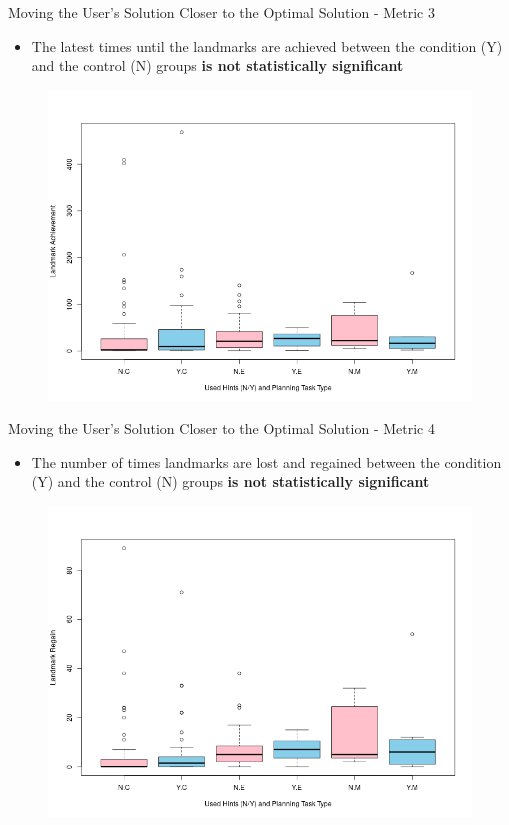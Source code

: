 \begin{frame}{Moving the User's Solution Closer to the Optimal Solution - Metric 3}

\begin{itemize}
\item The latest times until the landmarks are achieved between the condition (Y) and the control (N) groups \textbf{is not statistically significant}
\end{itemize}
\begin{figure}[tpb]
  \centering
\includegraphics[width=0.7\columnwidth]{../img/achbytype.png}
  \label{fig:achbytype}
\end{figure}

\end{frame}

\begin{frame} {Moving the User's Solution Closer to the Optimal Solution - Metric 4}
\begin{itemize}
\item The number of times landmarks are lost and regained between the condition (Y) and the control (N) groups \textbf{is not statistically significant}
\end{itemize}
\begin{figure}[tpb]
  \centering
\includegraphics[width=0.7\columnwidth]{../img/regainbytype.png}
  \label{fig:regainbytype}
\end{figure}
\end{frame}